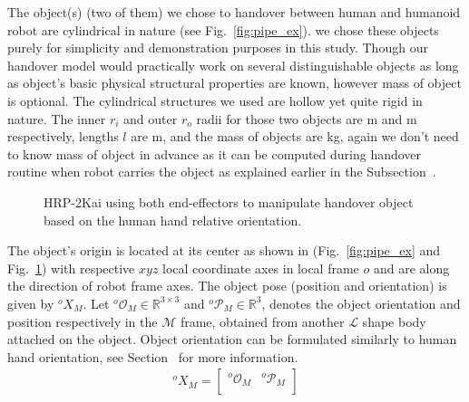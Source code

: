 The object(s) (two of them) we chose to handover between human and humanoid robot are cylindrical in nature (see Fig.~\ref{fig:pipe_ex}). we chose these objects purely for simplicity and demonstration purposes in this study. Though our handover model would practically work on several distinguishable objects as long as object's basic physical structural properties are known, however mass of object is optional. The cylindrical structures we used are hollow yet quite rigid in nature. The inner $r_i$ and outer $r_o$ radii for those two objects are  m and  m respectively, lengths $l$ are  m, and the mass of objects are  kg, again we don't need to know mass of object in advance as it can be computed during handover routine when robot carries the object as explained earlier in the Subsection~. 


\begin{figure}[hpt]
	\caption{HRP-2Kai using both end-effectors to manipulate handover object based on the human hand relative orientation.}
	\label{fig:pipe_ori}
\end{figure}


The object's origin is located at its center as shown in (Fig.~\ref{fig:pipe_ex} and Fig.~\ref{fig:pipe_ori}) with respective $xyz$ local coordinate axes in local frame $o$ and are along the direction of robot frame axes. The object pose (position and orientation) is given by ${}^{o}{X}_M$. Let ${{}^{o}\mathcal{O}_M} \in \mathbb{R}^{3\times3}$ and ${{}^{o}\mathcal{P}_M} \in \mathbb{R}^{3}$, denotes the object orientation and position respectively in the $\mathcal{M}$ frame, obtained from another $\mathcal{L}$ shape body attached on the object. Object orientation can be formulated similarly to human hand orientation, see Section~ for more information.
\begin{gather}\label{X_M_o}
{}^{o}{X}_M =
\left[\begin{array}{cc}
{}^{o}\mathcal{O}_M & {}^{o}\mathcal{P}_M \\
\end{array}\right]
\end{gather}



